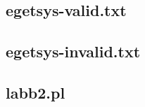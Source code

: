 \documentclass[a4paper,11pt]{article}
\begin{document}
\newpage
\subsection{egetsys-valid.txt}


\newpage
\subsection{egetsys-invalid.txt}


\newpage
\subsection{labb2.pl}

\end{document}
